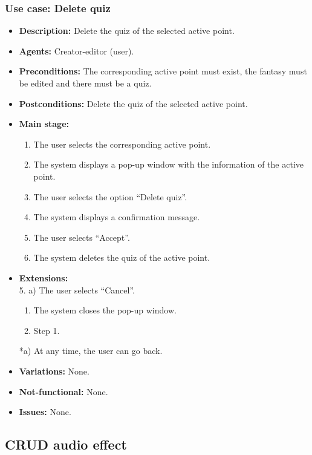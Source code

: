 \subsubsection{Use case: Delete quiz}
\begin{itemize}
	\item \textbf{Description:} Delete the quiz of the selected active point.
	\item \textbf{Agents:} Creator-editor (user).
	\item \textbf{Preconditions:} The corresponding active point must exist, the fantasy must be edited and there must be a quiz.
	\item \textbf{Postconditions:} Delete the quiz of the selected active point.
	\item \textbf{Main stage:}
	\begin{enumerate}
		\item The user selects the corresponding active point.
		\item The system displays a pop-up window with the information of the active point.
		\item The user selects the option ``Delete quiz''.
		\item The system displays a confirmation message.
		\item The user selects ``Accept''.
		\item The system deletes the quiz of the active point.
	\end{enumerate}
	\item \textbf{Extensions:} \\ 5. a) The user selects ``Cancel''.
	\begin{enumerate}
		\item The system closes the pop-up window.
		\item Step 1.
	\end{enumerate}
	*a) At any time, the user can go back.
	\item \textbf{Variations:} None.
	\item \textbf{Not-functional:} None.
	\item \textbf{Issues:} None.
\end{itemize}

\subsection{CRUD audio effect}
\hypertarget{crearaudio}{}
